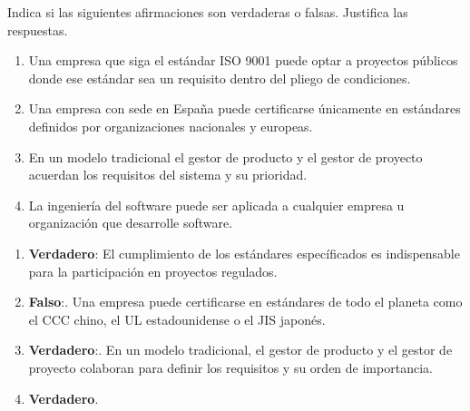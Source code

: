 

\begin{enunciado}
    Indica si las siguientes afirmaciones son verdaderas o falsas. Justifica las respuestas.
    \begin{enumerate}
        \item Una empresa que siga el estándar ISO 9001 puede optar a proyectos públicos donde ese
        estándar sea un requisito dentro del pliego de condiciones.
        \item Una empresa con sede en España puede certificarse únicamente en estándares definidos
        por organizaciones nacionales y europeas.
        \item En un modelo tradicional el gestor de producto y el gestor de proyecto acuerdan los
        requisitos del sistema y su prioridad.
        \item La ingeniería del software puede ser aplicada a cualquier empresa u organización que
        desarrolle software.
    \end{enumerate}
\end{enunciado}

\begin{solucion}
    \begin{enumerate}
        \item \textbf{Verdadero}:
        El cumplimiento de los estándares específicados es indispensable para la participación en proyectos regulados.
        \item \textbf{Falso}:.
        Una empresa puede certificarse en estándares de todo el planeta como el CCC chino, el UL estadounidense o el JIS japonés.
        \item \textbf{Verdadero}:.
        En un modelo tradicional, el gestor de producto y el gestor de proyecto colaboran para definir los requisitos y su orden de importancia.
        \item \textbf{Verdadero}.
    \end{enumerate}
\end{solucion}